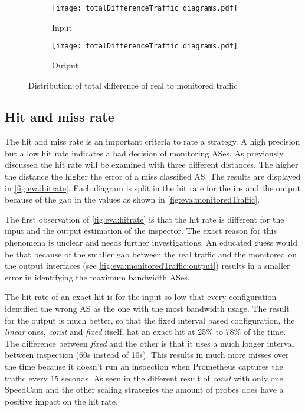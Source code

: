 \documentclass[thesis.tex]{subfiles}
\begin{document}
\begin{figure}[h]
	\centering
	\begin{subfigure}{.48\linewidth}
		\centering
		\texttt{[image: totalDifferenceTraffic\_diagrams.pdf]}
		\caption{Input}
		\label{fig:eva:precisionTotal:input}
	\end{subfigure}
	\begin{subfigure}{0.48\linewidth}
		\centering
		\texttt{[image: totalDifferenceTraffic\_diagrams.pdf]}
		\caption{Output}
		\label{fig:eva:precisionTotal:output}
	\end{subfigure}
	\caption{Distribution of total difference of real to monitored traffic}
	\label{fig:eva:precisionTotal}
\end{figure}


\subsection{Hit and miss rate} \label{sec:eva:hitrate}
The hit and miss rate is an important criteria to rate a strategy. A high precision but a low hit rate indicates a bad decision of monitoring ASes. As previously discussed the hit rate will be examined with three different distances. The higher the distance the higher the error of a miss classified AS. The results are displayed in \autoref{fig:eva:hitrate}. Each diagram is split in the hit rate for the in- and the output because of the gab in the values as shown in \autoref{fig:eva:monitoredTraffic}.

The first observation of \autoref{fig:eva:hitrate} is that the hit rate is different for the input and the output estimation of the inspector. The exact reason for this phenomena is unclear and needs further investigations. An educated guess would be that because of the smaller gab between the real traffic and the monitored on the output interfaces (see \autoref{fig:eva:monitoredTraffic:output}) results in a smaller error in identifying the maximum bandwidth ASes.

The hit rate of an exact hit is for the input so low that every configuration identified the wrong AS as the one with the most bandwidth usage. The result for the output is much better, so that the fixed interval based configuration, the \textit{linear} ones, \textit{const} and \textit{fixed} itself, hat an exact hit at 25\% to 78\% of the time. The difference between \textit{fixed} and the other is that it uses a much longer interval between inspection (60s instead of 10s). This results in much more misses over the time because it doesn't run an inspection when Prometheus captures the traffic every 15 seconds. As seen in the different result of \textit{const} with only one SpeedCam and the other scaling strategies the amount of probes does have a positive impact on the hit rate. 
\end{document}
